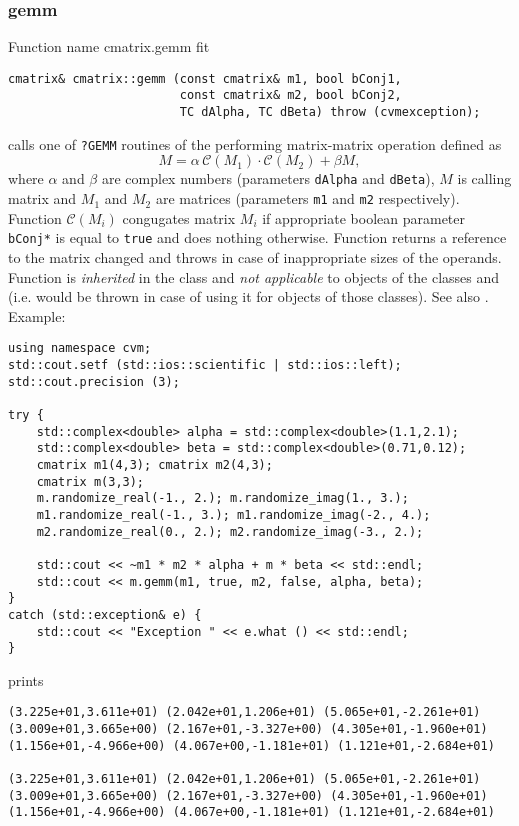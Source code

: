 \subsubsection{gemm}
Function%
\pdfdest name {cmatrix.gemm} fit
\begin{verbatim}
cmatrix& cmatrix::gemm (const cmatrix& m1, bool bConj1, 
                        const cmatrix& m2, bool bConj2, 
                        TC dAlpha, TC dBeta) throw (cvmexception);
\end{verbatim}
calls one of \verb"?GEMM" routines of the
performing  
matrix-matrix operation defined as
\begin{equation*}
M=\alpha\,\mathcal{C}(M_1)\cdot\mathcal{C}(M_2) + \beta M,
\end{equation*}
where $\alpha$ and $\beta$ are complex numbers
(parameters \verb"dAlpha" and \verb"dBeta"),
$M$ is  calling matrix
and $M_1$ and $M_2$ are matrices (parameters \verb"m1"
and \verb"m2" respectively). Function $\mathcal{C}(M_i)$
congugates matrix $M_i$ if appropriate boolean
parameter \verb"bConj*" is equal to \verb"true"
and does nothing otherwise.
Function
returns a reference to the matrix changed and throws
in case of inappropriate sizes of the operands.
Function is \emph{inherited} in  the class
 and
\emph{not applicable} to objects of the classes
 and
 (i.e.  would be thrown
in case of using it for objects of those classes).
See also
.
Example:
\begin{Verbatim}
using namespace cvm;
std::cout.setf (std::ios::scientific | std::ios::left); 
std::cout.precision (3);

try {
    std::complex<double> alpha = std::complex<double>(1.1,2.1);
    std::complex<double> beta = std::complex<double>(0.71,0.12);
    cmatrix m1(4,3); cmatrix m2(4,3);
    cmatrix m(3,3);
    m.randomize_real(-1., 2.); m.randomize_imag(1., 3.); 
    m1.randomize_real(-1., 3.); m1.randomize_imag(-2., 4.); 
    m2.randomize_real(0., 2.); m2.randomize_imag(-3., 2.);

    std::cout << ~m1 * m2 * alpha + m * beta << std::endl;
    std::cout << m.gemm(m1, true, m2, false, alpha, beta);
}
catch (std::exception& e) {
    std::cout << "Exception " << e.what () << std::endl;
}
\end{Verbatim}
prints
\begin{Verbatim}
(3.225e+01,3.611e+01) (2.042e+01,1.206e+01) (5.065e+01,-2.261e+01)
(3.009e+01,3.665e+00) (2.167e+01,-3.327e+00) (4.305e+01,-1.960e+01)
(1.156e+01,-4.966e+00) (4.067e+00,-1.181e+01) (1.121e+01,-2.684e+01)

(3.225e+01,3.611e+01) (2.042e+01,1.206e+01) (5.065e+01,-2.261e+01)
(3.009e+01,3.665e+00) (2.167e+01,-3.327e+00) (4.305e+01,-1.960e+01)
(1.156e+01,-4.966e+00) (4.067e+00,-1.181e+01) (1.121e+01,-2.684e+01)
\end{Verbatim}
\newpage


